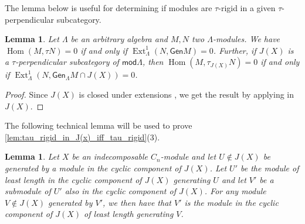 \documentclass[11pt]{amsart}
\newcommand{\Gen}{\mathsf{Gen}}
\newcommand{\mods}{\mathsf{mod}}
\DeclareMathOperator{\Hom}{\mathrm{Hom}}
\DeclareMathOperator{\Ext}{\mathrm{Ext}}
\newtheorem{lemma}[theorem]{Lemma}
\theoremstyle{definition}
\begin{document}
The lemma below is useful for determining if modules are $\tau$-rigid in a given $\tau$-perpendicular subcategory.

\begin{lemma}\cite[Prop 5.8]{auslandersmalo81}\label{lem:ext_characterization_of_maps_to_tau}
    Let $\Lambda$ be an arbitrary algebra and $M,N$ two $\Lambda$-modules. We have $\Hom(M,\tau N) = 0$ if and only if $\Ext^1_\Lambda(N,\Gen M) = 0$. Further, if $J(X)$ is a $\tau$-perpendicular subcategory of $\mods \Lambda$, then $\Hom(M,\tau_{J(X)}N) = 0$ if and only if $\Ext^1_\Lambda(N,\Gen_\Lambda M \cap J(X)) = 0$.
\end{lemma}



\begin{proof}
     Since $J(X)$ is closed under extensions \cite[Prop. 3.6, Thm. 3.8]{jassoreduction}, we get the result by applying \cite[Prop 5.8]{auslandersmalo81} in $J(X)$.
\end{proof}


The following technical lemma will be used to prove \cref{lem:tau_rigid_in_J(x)_iff_tau_rigid}(3).

\begin{lemma}\label{lem:minimal_length_generator_in_cyclic_component}
Let $X$ be an indecomposable $C_n$-module and let $U \notin J(X)$ be generated by a module in the cyclic component of $J(X)$. Let $U'$ be the module of least length in the cyclic component of $J(X)$ generating $U$ and let $V'$ be a submodule of $U'$ also in the cyclic component of $J(X)$. For any module $V \notin J(X)$ generated by $V'$, we then have that $V'$ is the module in the cyclic component of $J(X)$ of least length generating $V$.
\end{lemma}
\end{document}
